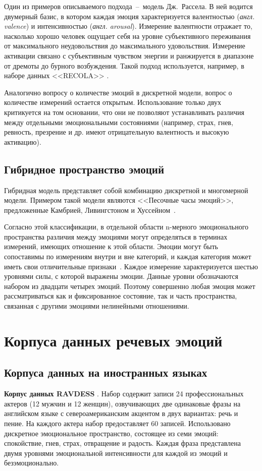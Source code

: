 Один из примеров описываемого подхода~--~модель Дж.~Рассела. В ней водится двумерный базис, в котором каждая эмоция характеризуется валентностью (\textit{англ. valence}) и интенсивностью (\textit{англ. arousal}). Измерение валентности отражает то,
насколько хорошо человек ощущает себя на уровне субъективного переживания от максимального неудовольствия до максимального удовольствия. Измерение активации связано с
субъективным чувством энергии и ранжируется в диапазоне от дремоты до бурного возбуждения. Такой подход используется, например, в наборе данных <<RECOLA>> \cite{RECOLA}.

Аналогично вопросу о количестве эмоций в дискретной модели, вопрос о количестве измерений остается открытым. Использование только двух критикуется на том основании, что они не позволяют устанавливать различия между отдельными эмоциональными состояниями (например, страх, гнев, ревность, презрение и др. имеют отрицательную валентность и высокую активацию).

\subsection{Гибридное пространство эмоций}
Гибридная модель представляет собой комбинацию дискретной и многомерной модели. Примером такой модели являются <<Песочные часы эмоций>>, предложенные Камбрией, Ливингстоном и Хуссейном~\cite{hourglass}. 

Согласно этой классификации, в отдельной области n-мерного эмоционального пространства различия между эмоциями могут определяться в терминах измерений, имеющих отношение к этой области. Эмоции могут быть сопоставимы по измерениям внутри и вне категорий, и каждая категория может иметь свои отличительные признаки~\cite{Russell2003}. Каждое измерение характеризуется шестью уровнями силы, с которой выражены эмоции. Данные уровни обозначаются набором из двадцати четырех эмоций. Поэтому совершенно любая эмоция может рассматриваться как и фиксированное состояние, так и часть пространства, связанная с другими эмоциями нелинейными отношениями. 

\section{Корпуса данных речевых эмоций}
\subsection{Корпуса данных на иностранных языках}
\textbf{Корпус данных RAVDESS} \cite{ravdess}. Набор содержит записи 24 профессиональных актеров (12 мужчин и 12 женщин), озвучивающих две одинаковые фразы на английском языке с североамериканским акцентом в двух вариантах: речь и пение. На каждого актера набор предоставляет 60 записей. Использовано дискретное эмоциональное пространство, состоящее из семи эмоций: спокойствие, гнев, страх, отвращение и радость. Каждая фраза представлена двумя уровнями эмоциональной интенсивности для каждой из эмоций и безэмоционально. 

